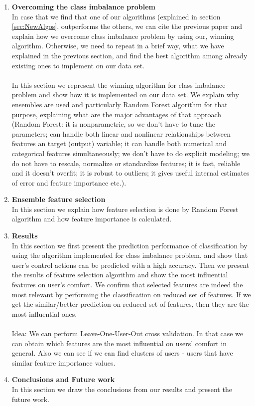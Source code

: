 \documentclass[a4paper]{article}
\begin{document}
\begin{enumerate}[I]
\item \textbf{Overcoming the class imbalance problem}\\
\color{red} In case that we find that one of our algorithms (explained in section \ref{sec:NewAlgos}, outperforms the others, we can cite the previous paper and explain how we overcome class imbalance problem by using our, winning algorithm. Otherwise, we need to repeat in a brief way, what we have explained in the previous section, and find the best algorithm among already existing ones to implement on our data set.\color{black}
\\\\
In this section we represent the winning algorithm for class imbalance problem and show how it is implemented on our data set. We explain why ensembles are used and particularly Random Forest algorithm for that purpose, explaining what are the major advantages of that approach (Random Forest: it is nonparametric, so we don't have to tune the parameters; can handle both linear and nonlinear relationships between features an target (output) variable; it can handle both numerical and categorical features simultaneously; we don't have to do explicit modeling; we do not have to rescale, normalize or standardize features; it is fast, reliable and it doesn't overfit; it is robust to outliers; it gives useful internal estimates of error and feature importance etc.).

\item \textbf{Ensemble feature selection}\\
In this section we explain how feature selection is done by Random Forest algorithm and how feature importance is calculated. 

\item \textbf{Results} \\
In this section we first present the prediction performance of classification by using the algorithm implemented for class imbalance problem, and show that user's control actions can be predicted with a high accuracy. Then we present the results of feature selection algorithm and show the most influential features on user's comfort. We confirm that selected features are indeed the most relevant by performing the classification on reduced set of features. If we get the similar/better prediction on reduced set of features, then they are the most influential ones. 
\\\\
\color{red} Idea: We can perform Leave-One-User-Out cross validation. In that case we can obtain which features are the most influential on users' comfort in general. Also we can see  if we can find clusters of users - users that have similar feature importance values.
\color{black}

\item \textbf{Conclusions and Future work}\\
In this section we draw the conclusions from our results and present the future work.
\end{enumerate}
\end{document}
